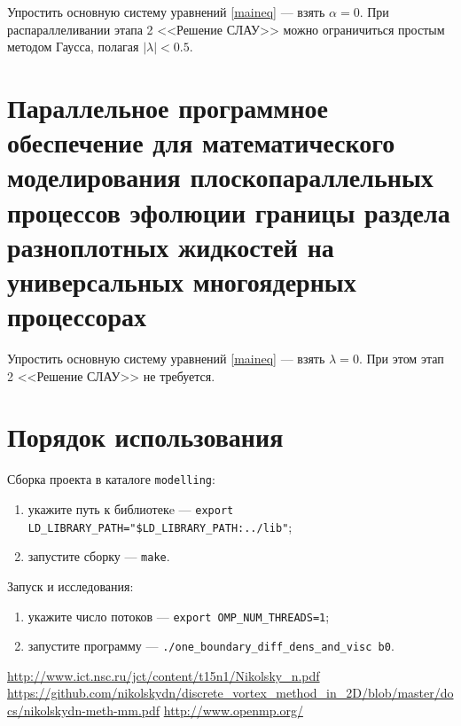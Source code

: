 \documentclass[a4paper]{report}
\numberwithin{algorithm}{section}
\begin{document}
Упростить основную систему уравнений \eqref{maineq} --- взять $\alpha=0$. 
При распараллеливании этапа 2 <<Решение СЛАУ>> можно ограничиться простым методом Гаусса, полагая  $| \lambda | < 0.5$.

\section{Параллельное программное обеспечение для математического моделирования плоскопараллельных процессов эфолюции границы раздела разноплотных жидкостей на универсальных многоядерных процессорах}

Упростить основную систему уравнений \eqref{maineq} --- взять $\lambda=0$. При этом этап 2 
<<Решение СЛАУ>>  не требуется.


\section{Порядок использования}

Сборка проекта в каталоге \verb|modelling|:
\begin{enumerate}
    \item укажите путь к библиотекe --- \verb*|export LD_LIBRARY_PATH="$LD_LIBRARY_PATH:../lib"|;
    \item запустите сборку --- \verb|make|.
\end{enumerate}


Запуск и исследования:
\begin{enumerate}
    \item укажите число потоков --- \verb|export OMP_NUM_THREADS=1|;
    \item запустите программу  --- \verb|./one_boundary_diff_dens_and_visc b0|.
\end{enumerate}



\begin{thebibliography}{99}
    \label{sec:literature}
        \url{http://www.ict.nsc.ru/jct/content/t15n1/Nikolsky_n.pdf}
        \url{https://github.com/nikolskydn/discrete_vortex_method_in_2D/blob/master/docs/nikolskydn-meth-mm.pdf}
     \url{http://www.openmp.org/}
\end{thebibliography}
\end{document}
